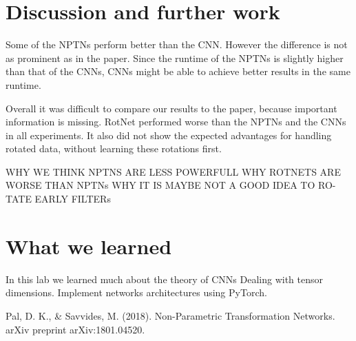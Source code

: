 \documentclass{llncs}
\begin{document}
\section{Discussion and further work}
Some of the NPTNs perform better than the CNN. However the difference is not as prominent as in the paper. Since the runtime of the NPTNs is slightly higher than that of the CNNs, CNNs might be able to achieve better results in the same runtime.

Overall it was difficult to compare our results to the paper, because important information is missing. 
RotNet performed worse than the NPTNs and the CNNs in all experiments.
It also did not show the expected advantages for handling rotated data, without learning these rotations first. 

WHY WE THINK NPTNS ARE LESS POWERFULL WHY ROTNETS ARE
WORSE THAN NPTNs WHY IT IS MAYBE NOT A GOOD IDEA TO RO-
TATE EARLY FILTERs

\section{What we learned}
In this lab we learned much about the theory of CNNs 
Dealing with tensor dimensions.
Implement networks architectures using PyTorch.

%
%
\begin{thebibliography}{}
%
Pal, D. K., \& Savvides, M. (2018). Non-Parametric Transformation Networks. arXiv preprint arXiv:1801.04520.


%
%


\end{thebibliography}
%
\end{document}
